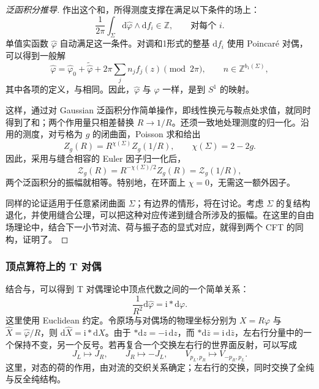 \begin{proof}[泛函积分推导]
作出这个和，所得测度支撑在满足以下条件的场上：
\[
\frac1{2\pi}\int_\Sigma
\mathrm{d}\widehat\varphi\wedge\mathrm{d}f_i\in\mathbb{Z},
\qquad\text{对每个 }i.
\]
单值实函数 $\widehat\varphi$ 自动满足这一条件。对调和1形式的整基 $\mathrm{d}f_i$ 使用 Poincar\'e 对偶，可以得到一般解
\begin{equation}\label{eq:3.67}
\widehat\varphi=\widehat\varphi_0+
\widetilde{\widehat\varphi}+2\pi\sum_j n_j f_j(z)
\pmod{2\pi},\qquad
n\in\mathbb{Z}^{b_1(\Sigma)},
\end{equation}
其中各项的定义，与相同。因此，$\widehat\varphi$ 与 $\varphi$ 一样，是到 $S^1$ 的映射。

这样，通过对 Gaussian 泛函积分作简单操作，即线性换元与鞍点处求值，就同时得到了和；两个作用量只相差替换 $R\to1/R$。还须一致地处理测度的归一化。沿用的测度，对亏格为 $g$ 的闭曲面，Poisson 求和给出
\[
Z_g(R)=R^{\chi(\Sigma)}Z_g(1/R),
\qquad\chi(\Sigma)=2-2g.
\]
因此，采用与缝合相容的 Euler 因子归一化后，
\[
\mathcal{Z}_g(R)=R^{-\chi(\Sigma)/2}Z_g(R)
=\mathcal{Z}_g(1/R),
\]
两个泛函积分的振幅就相等。特别地，在环面上 $\chi=0$，无需这一额外因子。

同样的论证适用于任意紧闭曲面 $\Sigma$；有边界的情形，将在讨论。考虑 $\Sigma$ 的复结构退化，并使用缝合公理，可以把这种对应传递到缝合所涉及的振幅。在这里的自由场理论中，结合下一小节对流、荷与振子态的显式对应，就得到两个 CFT 的同构，证明了。
\end{proof}

\subsubsection{顶点算符上的 T 对偶}\label{sec:3.2.3.7}

结合与，可以得到 T 对偶理论中顶点代数之间的一个简单关系：
\[
\frac1{R^2}\mathrm{d}\widehat\varphi
=\mathrm{i}*\mathrm{d}\varphi.
\]
这里使用 Euclidean 约定。令原场与对偶场的物理坐标分别为 $X=R\varphi$ 与 $\widehat X=\widehat\varphi/R$，则 $\mathrm{d}\widehat X=\mathrm{i}*\mathrm{d}X$。由于 $*\mathrm{d}z=-\mathrm{i}\,\mathrm{d}z$，而 $*\mathrm{d}\bar z=\mathrm{i}\,\mathrm{d}\bar z$，左右行分量中的一个保持不变，另一个反号。若再复合一个交换左右行的世界面反射，可以写成
\begin{equation}\label{eq:3.68}
J_L\longmapsto J_R,\qquad
J_R\longmapsto-J_L,\qquad
V_{p_L,p_R}\longmapsto V_{-p_R,p_L}.
\end{equation}
这里，对态的荷的作用，由对流的交织关系确定；左右行的交换，同时交换了全纯与反全纯结构。

